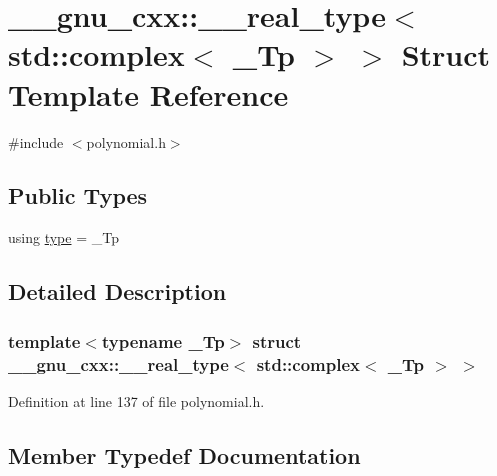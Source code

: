 \hypertarget{struct____gnu__cxx_1_1____real__type_3_01std_1_1complex_3_01__Tp_01_4_01_4}{}\section{\+\_\+\+\_\+gnu\+\_\+cxx\+:\+:\+\_\+\+\_\+real\+\_\+type$<$ std\+:\+:complex$<$ \+\_\+\+Tp $>$ $>$ Struct Template Reference}
\label{struct____gnu__cxx_1_1____real__type_3_01std_1_1complex_3_01__Tp_01_4_01_4}


{\ttfamily \#include $<$polynomial.\+h$>$}

\subsection*{Public Types}
\begin{DoxyCompactItemize}
\item 
using \hyperlink{struct____gnu__cxx_1_1____real__type_3_01std_1_1complex_3_01__Tp_01_4_01_4_a038d9970ff97c1b3eeb53f5eb08fdfe1}{type} = \+\_\+\+Tp
\end{DoxyCompactItemize}


\subsection{Detailed Description}
\subsubsection*{template$<$typename \+\_\+\+Tp$>$\newline
struct \+\_\+\+\_\+gnu\+\_\+cxx\+::\+\_\+\+\_\+real\+\_\+type$<$ std\+::complex$<$ \+\_\+\+Tp $>$ $>$}



Definition at line 137 of file polynomial.\+h.



\subsection{Member Typedef Documentation}
\mbox{\label{struct____gnu__cxx_1_1____real__type_3_01std_1_1complex_3_01__Tp_01_4_01_4_a038d9970ff97c1b3eeb53f5eb08fdfe1}} 

